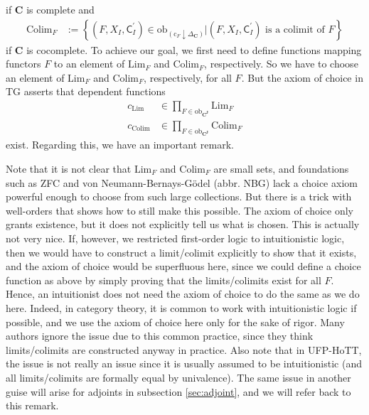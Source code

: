 if $\mathbf{C}$ is complete and
\begin{align*}
  \mathrm{Colim}_{F}
  &:=
  \left\lbrace
      (F,X_{I},\mathsf{C}_{I}^{\prime})
      \in
      \mathrm{ob}_{(\mathrm{c}_{F} \downarrow \Delta_{\mathbf{C}})}
    \vert
      (F,X_{I},\mathsf{C}_{I}^{\prime})
      \text{ is a colimit of }
      F
  \right\rbrace
\end{align*}
if $\mathbf{C}$ is cocomplete.
To achieve our goal, we first need to define functions mapping functors $F$ to an element of $\mathrm{Lim}_{F}$ and $\mathrm{Colim}_{F}$, respectively.
So we have to choose an element of $\mathrm{Lim}_{F}$ and $\mathrm{Colim}_{F}$, respectively, for all $F$.
But the axiom of choice in TG asserts that dependent functions
\begin{align*}
  c_{\mathrm{Lim}}
  &\in
  \prod_{F \in \mathrm{ob}_{\mathbf{C}^{\mathbf{J}}}}
  \mathrm{Lim}_{F}
  \\
  c_{\mathrm{Colim}}
  &\in
  \prod_{F \in \mathrm{ob}_{\mathbf{C}^{\mathbf{J}}}}
  \mathrm{Colim}_{F}
\end{align*}
exist.
Regarding this, we have an important remark.
\\
\begin{rem}
\label{rem:ordinaltrick}
Note that it is not clear that $\mathrm{Lim}_{F}$ and $\mathrm{Colim}_{F}$ are small sets, and foundations such as ZFC and von Neumann-Bernays-G\"odel (abbr. NBG) lack a choice axiom powerful enough to choose from such large collections.
But there is a trick with well-orders that shows how to still make this possible.
The axiom of choice only grants existence, but it does not explicitly tell us what is chosen.
This is actually not very nice.
If, however, we restricted first-order logic to intuitionistic logic, then we would have to construct a limit/colimit explicitly to show that it exists, and the axiom of choice would be superfluous here, since we could define a choice function as above by simply proving that the limits/colimits exist for all $F$.
Hence, an intuitionist does not need the axiom of choice to do the same as we do here.
Indeed, in category theory, it is common to work with intuitionistic logic if possible, and we use the axiom of choice here only for the sake of rigor.
Many authors ignore the issue due to this common practice, since they think limits/colimits are constructed anyway in practice.
Also note that in UFP-HoTT, the issue is not really an issue since it is usually assumed to be intuitionistic (and all limits/colimits are formally equal by univalence).
The same issue in another guise will arise for adjoints in subsection \ref{sec:adjoint}, and we will refer back to this remark.
\end{rem}

